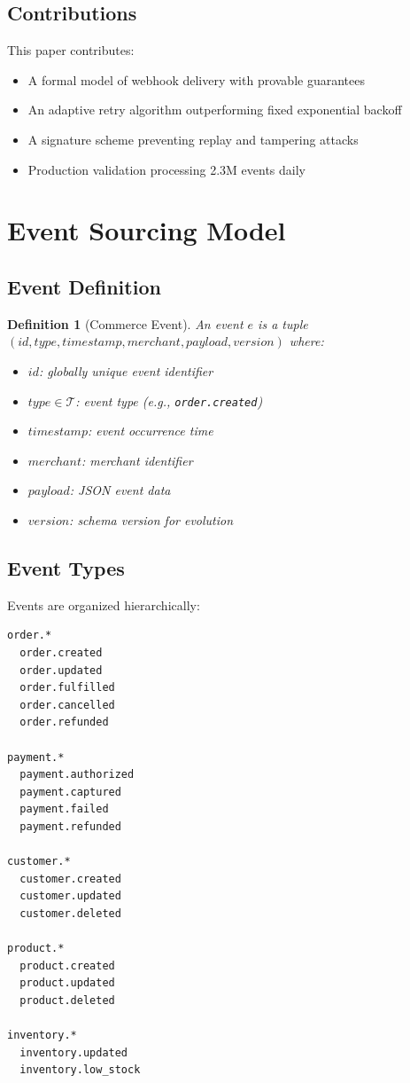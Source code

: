 \documentclass[11pt,a4paper]{article}
\newtheorem{definition}[theorem]{Definition}
\begin{document}
\subsection{Contributions}

This paper contributes:

\begin{itemize}
    \item A formal model of webhook delivery with provable guarantees
    \item An adaptive retry algorithm outperforming fixed exponential backoff
    \item A signature scheme preventing replay and tampering attacks
    \item Production validation processing 2.3M events daily
\end{itemize}

\section{Event Sourcing Model}

\subsection{Event Definition}

\begin{definition}[Commerce Event]
An event $e$ is a tuple $(id, type, timestamp, merchant, payload, version)$ where:
\begin{itemize}
    \item $id$: globally unique event identifier
    \item $type \in \mathcal{T}$: event type (e.g., \texttt{order.created})
    \item $timestamp$: event occurrence time
    \item $merchant$: merchant identifier
    \item $payload$: JSON event data
    \item $version$: schema version for evolution
\end{itemize}
\end{definition}

\subsection{Event Types}

Events are organized hierarchically:

\begin{lstlisting}[caption=Event Type Hierarchy]
order.*
  order.created
  order.updated
  order.fulfilled
  order.cancelled
  order.refunded

payment.*
  payment.authorized
  payment.captured
  payment.failed
  payment.refunded

customer.*
  customer.created
  customer.updated
  customer.deleted

product.*
  product.created
  product.updated
  product.deleted

inventory.*
  inventory.updated
  inventory.low_stock
\end{lstlisting}
\end{document}
